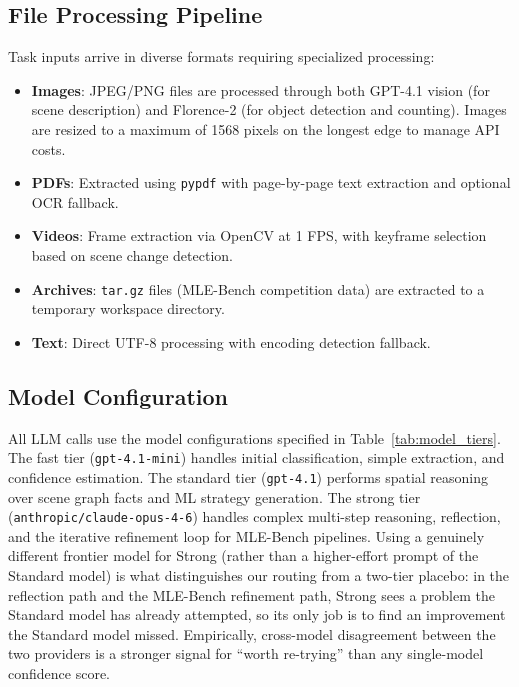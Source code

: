 \documentclass[11pt]{article}
\begin{document}
\subsection{File Processing Pipeline}

Task inputs arrive in diverse formats requiring specialized processing:

\begin{itemize}[leftmargin=*,itemsep=1pt]
  \item \textbf{Images}: JPEG/PNG files are processed through both GPT-4.1 vision (for scene description) and Florence-2 (for object detection and counting). Images are resized to a maximum of 1568 pixels on the longest edge to manage API costs.
  \item \textbf{PDFs}: Extracted using \texttt{pypdf} with page-by-page text extraction and optional OCR fallback.
  \item \textbf{Videos}: Frame extraction via OpenCV at 1 FPS, with keyframe selection based on scene change detection.
  \item \textbf{Archives}: \texttt{tar.gz} files (MLE-Bench competition data) are extracted to a temporary workspace directory.
  \item \textbf{Text}: Direct UTF-8 processing with encoding detection fallback.
\end{itemize}

\subsection{Model Configuration}

All LLM calls use the model configurations specified in Table~\ref{tab:model_tiers}. The fast tier (\texttt{gpt-4.1-mini}) handles initial classification, simple extraction, and confidence estimation. The standard tier (\texttt{gpt-4.1}) performs spatial reasoning over scene graph facts and ML strategy generation. The strong tier (\texttt{anthropic/claude-opus-4-6}) handles complex multi-step reasoning, reflection, and the iterative refinement loop for MLE-Bench pipelines. Using a genuinely different frontier model for Strong (rather than a higher-effort prompt of the Standard model) is what distinguishes our routing from a two-tier placebo: in the reflection path and the MLE-Bench refinement path, Strong sees a problem the Standard model has already attempted, so its only job is to find an improvement the Standard model missed. Empirically, cross-model disagreement between the two providers is a stronger signal for ``worth re-trying'' than any single-model confidence score.
\end{document}

